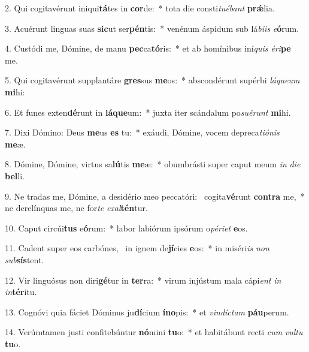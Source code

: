 2. Qui cogitavérunt iniqui\textbf{tá}tes in \textbf{cor}de:~*  tota die consti\textit{tu}\textit{é}\textit{bant} \textbf{prǽ}lia.\

3. Acuérunt linguas suas \textbf{sic}ut ser\textbf{pén}tis:~*  venénum áspidum sub lá\textit{bi}\textit{is} \textit{e}\textbf{ó}rum.\

4. Custódi me, Dómine, de manu \textbf{pec}ca\textbf{tó}ris:~*  et ab homínibus iní\textit{quis} \textit{é}\textit{ri}\textbf{pe} me.\

5. Qui cogitavérunt supplantáre \textbf{gres}sus \textbf{me}os:~*  abscondérunt supérbi \textit{lá}\textit{que}\textit{um} \textbf{mi}hi:\

6. Et funes exten\textbf{dé}runt in \textbf{lá}\textbf{que}um:~*  juxta iter scándalum po\textit{su}\textit{é}\textit{runt} \textbf{mi}hi.\

7. Dixi Dómino: Deus \textbf{me}us \textbf{es} tu:~*  exáudi, Dómine, vocem depreca\textit{ti}\textit{ó}\textit{nis} \textbf{me}æ.\

8. Dómine, Dómine, virtus sa\textbf{lú}tis \textbf{me}æ:~*  obumbrásti super caput meum \textit{in} \textit{di}\textit{e} \textbf{bel}li.\

9. Ne tradas me, Dómine, a desidério meo peccatóri: \dag\  cogita\textbf{vé}runt \textbf{con}\textbf{tra} me,~*  ne derelínquas me, ne for\textit{te} \textit{ex}\textit{al}\textbf{tén}tur.\

10. Caput circúi\textbf{tus} e\textbf{ó}rum:~*  labor labiórum ipsórum o\textit{pé}\textit{ri}\textit{et} \textbf{e}os.\

11. Cadent super eos carbónes, \dag\  in ignem de\textbf{jí}cies \textbf{e}os:~*  in miséri\textit{is} \textit{non} \textit{sub}\textbf{sís}tent.\

12. Vir linguósus non diri\textbf{gé}tur in \textbf{ter}ra:~*  virum injústum mala cápi\textit{ent} \textit{in} \textit{in}\textbf{tér}itu.\

13. Cognóvi quia fáciet Dóminus ju\textbf{dí}cium \textbf{ín}\textbf{o}pis:~*  et \textit{vin}\textit{díc}\textit{tam} \textbf{páu}perum.\

14. Verúmtamen justi confitebúntur \textbf{nó}mini \textbf{tu}o:~*  et habitábunt recti \textit{cum} \textit{vul}\textit{tu} \textbf{tu}o.\

